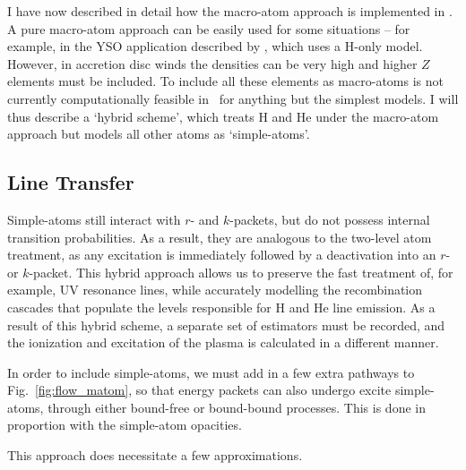 I have now described in detail how the macro-atom approach is 
implemented in \py. A pure macro-atom approach can be easily used for
some situations -- for example, in the YSO application described by 
\cite{simmacro2005}, which uses a H-only model. However, in accretion
disc winds the densities can be very high and higher $Z$ elements must be 
included. To include all these elements as macro-atoms is not
currently computationally feasible in \py\ for anything but the simplest
models. I will thus describe a `hybrid scheme', which treats H and He
under the macro-atom approach but models all other atoms 
as `simple-atoms'. 

\subsection{Line Transfer}

Simple-atoms still interact with $r$- and $k$-packets,
but do not possess internal transition probabilities. As a result,
they are analogous to the two-level atom treatment, as any excitation
is immediately followed by a deactivation into an $r$- or $k$-packet.
This hybrid approach allows us to preserve the fast treatment 
of, for example, UV resonance lines, while accurately 
modelling the recombination cascades that populate the levels 
responsible for H and He line emission. As a result of this hybrid
scheme, a separate set of estimators must be recorded, and the ionization
and excitation of the plasma is calculated in a different manner.

In order to include simple-atoms, we must add in a few extra pathways
to Fig.~\ref{fig:flow_matom}, so that energy packets can also
undergo excite simple-atoms, through either bound-free or bound-bound
processes. This is done in proportion with the simple-atom opacities.

This approach does necessitate a few approximations.

